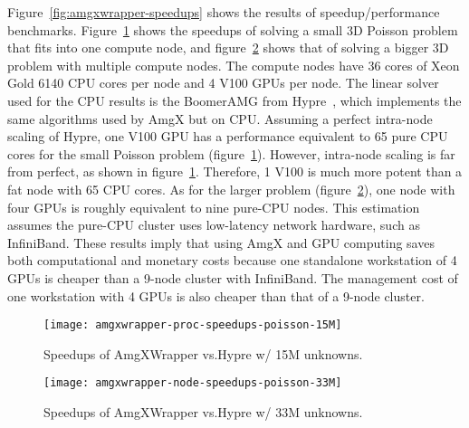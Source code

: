 Figure~\ref{fig:amgxwrapper-speedups} shows the results of speedup/performance benchmarks.
Figure~\ref{fig:amgxwrapper-speedups-15M} shows the speedups of solving a small 3D Poisson problem that fits into one compute node, and figure~\ref{fig:amgxwrapper-speedups-33M} shows that of solving a bigger 3D problem with multiple compute nodes.
The compute nodes have 36 cores of Xeon Gold 6140 CPU cores per node and 4 V100 GPUs per node.
The linear solver used for the CPU results is the BoomerAMG from Hypre~\cite{henson_boomeramg_2002}, which implements the same algorithms used by AmgX but on CPU\@.
Assuming a perfect intra-node scaling of Hypre, one V100 GPU has a performance equivalent to 65 pure CPU cores for the small Poisson problem (figure~\ref{fig:amgxwrapper-speedups-15M}).
However, intra-node scaling is far from perfect, as shown in figure~\ref{fig:amgxwrapper-speedups-15M}.
Therefore, 1 V100 is much more potent than a fat node with 65 CPU cores.
As for the larger problem (figure~\ref{fig:amgxwrapper-speedups-33M}), one node with four GPUs is roughly equivalent to nine pure-CPU nodes.
This estimation assumes the pure-CPU cluster uses low-latency network hardware, such as InfiniBand.
These results imply that using AmgX and GPU computing saves both computational and monetary costs because one standalone workstation of 4 GPUs is cheaper than a 9-node cluster with InfiniBand.
The management cost of one workstation with 4 GPUs is also cheaper than that of a 9-node cluster.

\begin{figure}[hbt!]
    \texttt{[image: amgxwrapper-proc-speedups-poisson-15M]}
    \caption{Speedups of AmgXWrapper vs.\@ Hypre w/ 15M unknowns.}\label{fig:amgxwrapper-speedups-15M}
\end{figure}

\begin{figure}[hbt!]
    \texttt{[image: amgxwrapper-node-speedups-poisson-33M]}
    \caption{Speedups of AmgXWrapper vs.\@ Hypre w/ 33M unknowns.}\label{fig:amgxwrapper-speedups-33M}
\end{figure}

